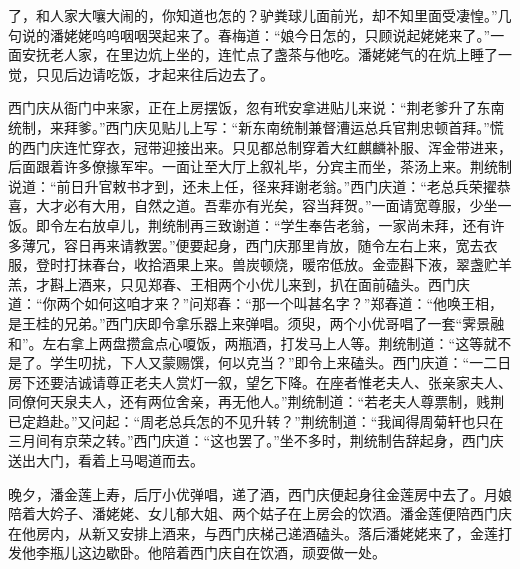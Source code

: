 了，和人家大嚷大闹的，你知道也怎的？驴粪球儿面前光，却不知里面受凄惶。”几句说的潘姥姥呜呜咽咽哭起来了。春梅道：“娘今日怎的，只顾说起姥姥来了。”一面安抚老人家，在里边炕上坐的，连忙点了盏茶与他吃。潘姥姥气的在炕上睡了一觉，只见后边请吃饭，才起来往后边去了。

西门庆从衙门中来家，正在上房摆饭，忽有玳安拿进贴儿来说：“荆老爹升了东南统制，来拜爹。”西门庆见贴儿上写：“新东南统制兼督漕运总兵官荆忠顿首拜。”慌的西门庆连忙穿衣，冠带迎接出来。只见都总制穿着大红麒麟补服、浑金带进来，后面跟着许多僚掾军牢。一面让至大厅上叙礼毕，分宾主而坐，茶汤上来。荆统制说道：“前日升官敕书才到，还未上任，径来拜谢老翁。”西门庆道：“老总兵荣擢恭喜，大才必有大用，自然之道。吾辈亦有光矣，容当拜贺。”一面请宽尊服，少坐一饭。即令左右放卓儿，荆统制再三致谢道：“学生奉告老翁，一家尚未拜，还有许多薄冗，容日再来请教罢。”便要起身，西门庆那里肯放，随令左右上来，宽去衣服，登时打抹春台，收拾酒果上来。兽炭顿烧，暖帘低放。金壶斟下液，翠盏贮羊羔，才斟上酒来，只见郑春、王相两个小优儿来到，扒在面前磕头。西门庆道：“你两个如何这咱才来？”问郑春：“那一个叫甚名字？”郑春道：“他唤王相，是王桂的兄弟。”西门庆即令拿乐器上来弹唱。须臾，两个小优哥唱了一套“霁景融和”。左右拿上两盘攒盒点心嗄饭，两瓶酒，打发马上人等。荆统制道：“这等就不是了。学生叨扰，下人又蒙赐馔，何以克当？”即令上来磕头。西门庆道：“一二日房下还要洁诚请尊正老夫人赏灯一叙，望乞下降。在座者惟老夫人、张亲家夫人、同僚何天泉夫人，还有两位舍亲，再无他人。”荆统制道：“若老夫人尊票制，贱荆已定趋赴。”又问起：“周老总兵怎的不见升转？”荆统制道：“我闻得周菊轩也只在三月间有京荣之转。”西门庆道：“这也罢了。”坐不多时，荆统制告辞起身，西门庆送出大门，看着上马喝道而去。

晚夕，潘金莲上寿，后厅小优弹唱，递了酒，西门庆便起身往金莲房中去了。月娘陪着大妗子、潘姥姥、女儿郁大姐、两个姑子在上房会的饮酒。潘金莲便陪西门庆在他房内，从新又安排上酒来，与西门庆梯己递酒磕头。落后潘姥姥来了，金莲打发他李瓶儿这边歇卧。他陪着西门庆自在饮酒，顽耍做一处。

